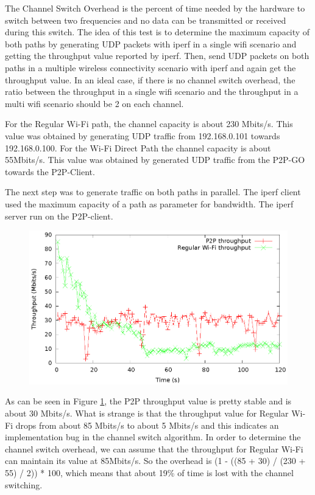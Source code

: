 The Channel Switch Overhead is the percent of time needed by the hardware to switch between two frequencies and no data can be transmitted or received during this switch. The idea of this test is to determine the maximum capacity of both paths by generating UDP packets with iperf in a single wifi scenario and getting the throughput value reported by iperf. Then, send UDP packets on both paths in a multiple wireless connectivity scenario with iperf and again get the throughput value. In an ideal case, if there is no channel switch overhead, the ratio between the throughput in a single wifi scenario and the throughput in a multi wifi scenario should be 2 on each channel.

For the Regular Wi-Fi path, the channel capacity is  about 230 Mbits/s. This value was obtained by generating UDP traffic from 192.168.0.101 towards 192.168.0.100. For the Wi-Fi Direct Path the channel capacity is about 55Mbits/s. This value was obtained by generated UDP traffic from the P2P-GO towards the P2P-Client.

The next step was to generate traffic on both paths in parallel. The iperf client used the maximum capacity of a path as parameter for bandwidth. The iperf server run on the P2P-client.

\begin{figure}[h!]
\includegraphics{src/img/throughpout.eps}
\label{img-thr}
\end{figure}

As can be seen in Figure \ref{img-thr}, the P2P throughput value is pretty stable and is about 30 Mbits/s. What is strange is that the throughput value for Regular Wi-Fi drops from about 85 Mbits/s to about 5 Mbits/s and this indicates an implementation bug in the channel switch algorithm. In order to determine the channel switch overhead, we can assume that the throughput for Regular Wi-Fi can maintain its value at 85Mbits/s. So the overhead is (1 - ((85 + 30) / (230 + 55) / 2)) * 100, which means that about 19\% of time is lost with the channel switching.

